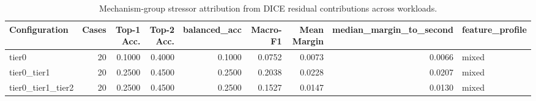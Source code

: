 \begin{table}[t]
\centering
\caption{Mechanism-group stressor attribution from DICE residual contributions across workloads.}
\label{tab:dice_stressor_diagnosis}
\footnotesize
\begin{tabular}{lrrrrrrrl}
\toprule
Configuration & Cases & Top-1 Acc. & Top-2 Acc. & balanced_acc & Macro-F1 & Mean Margin & median_margin_to_second & feature_profile \\
\midrule
tier0 & 20 & 0.1000 & 0.4000 & 0.1000 & 0.0752 & 0.0073 & 0.0066 & mixed \\
tier0_tier1 & 20 & 0.2500 & 0.4500 & 0.2500 & 0.2038 & 0.0228 & 0.0207 & mixed \\
tier0_tier1_tier2 & 20 & 0.2500 & 0.4500 & 0.2500 & 0.1527 & 0.0147 & 0.0130 & mixed \\
\bottomrule
\end{tabular}

\end{table}
